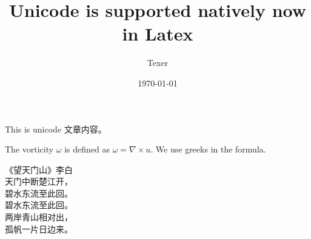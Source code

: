 \documentclass[11pt, letterpaper]{article}
\title{Unicode is supported natively now in Latex}
\author{Texer}
\date{\today}
\begin{document}
\maketitle
    This is unicode 文章内容。

    The vorticity $ω$ is defined as $ω = ∇ × u$.
    We use greeks in the formula.

    {\color{blue} \noindent
    《望天门山》李白\\
    天门中断楚江开，\\
    碧水东流至此回。\\
    碧水东流至此回。\\
    两岸青山相对出，\\
    孤帆一片日边来。}
\end{document}

